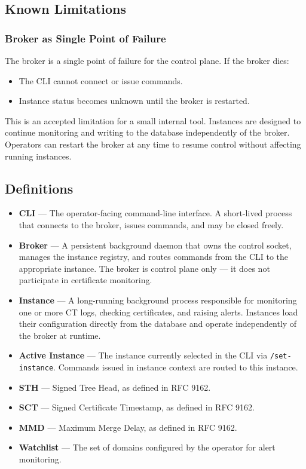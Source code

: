 \documentclass{article}
\begin{document}
\subsection{Known Limitations}
\subsubsection{Broker as Single Point of Failure}
The broker is a single point of failure for the control plane. If the broker
dies:
\begin{itemize}
    \item The CLI cannot connect or issue commands.
    \item Instance status becomes unknown until the broker is restarted.
\end{itemize}
This is an accepted limitation for a small internal tool. Instances are
designed to continue monitoring and writing to the database independently of
the broker. Operators can restart the broker at any time to resume control
without affecting running instances.

\subsection{Definitions}
\begin{itemize}
    \item \textbf{CLI} --- The operator-facing command-line interface. A
    short-lived process that connects to the broker, issues commands, and
    may be closed freely.
    \item \textbf{Broker} --- A persistent background daemon that owns the
    control socket, manages the instance registry, and routes commands from
    the CLI to the appropriate instance. The broker is control plane only ---
    it does not participate in certificate monitoring.
    \item \textbf{Instance} --- A long-running background process responsible
    for monitoring one or more CT logs, checking certificates, and raising
    alerts. Instances load their configuration directly from the database and
    operate independently of the broker at runtime.
    \item \textbf{Active Instance} --- The instance currently selected in the
    CLI via \texttt{/set-instance}. Commands issued in instance context are
    routed to this instance.
    \item \textbf{STH} --- Signed Tree Head, as defined in RFC 9162.
    \item \textbf{SCT} --- Signed Certificate Timestamp, as defined in RFC 9162.
    \item \textbf{MMD} --- Maximum Merge Delay, as defined in RFC 9162.
    \item \textbf{Watchlist} --- The set of domains configured by the operator
    for alert monitoring.
\end{itemize}
\end{document}
